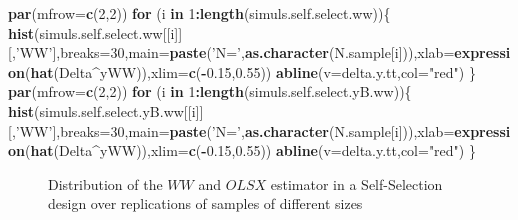 \documentclass[]{book}
\newenvironment{Shaded}{\begin{snugshade}}{\end{snugshade}}
\newcommand{\ControlFlowTok}[1]{\textcolor[rgb]{0.13,0.29,0.53}{\textbf{#1}}}
\newcommand{\DataTypeTok}[1]{\textcolor[rgb]{0.13,0.29,0.53}{#1}}
\newcommand{\DecValTok}[1]{\textcolor[rgb]{0.00,0.00,0.81}{#1}}
\newcommand{\FloatTok}[1]{\textcolor[rgb]{0.00,0.00,0.81}{#1}}
\newcommand{\KeywordTok}[1]{\textcolor[rgb]{0.13,0.29,0.53}{\textbf{#1}}}
\newcommand{\NormalTok}[1]{#1}
\newcommand{\OperatorTok}[1]{\textcolor[rgb]{0.81,0.36,0.00}{\textbf{#1}}}
\newcommand{\StringTok}[1]{\textcolor[rgb]{0.31,0.60,0.02}{#1}}
\theoremstyle{definition}
\theoremstyle{definition}
\theoremstyle{definition}
\theoremstyle{remark}
\begin{document}
\begin{Shaded}
\begin{Highlighting}[]
\KeywordTok{par}\NormalTok{(}\DataTypeTok{mfrow=}\KeywordTok{c}\NormalTok{(}\DecValTok{2}\NormalTok{,}\DecValTok{2}\NormalTok{))}
\ControlFlowTok{for}\NormalTok{ (i }\ControlFlowTok{in} \DecValTok{1}\OperatorTok{:}\KeywordTok{length}\NormalTok{(simuls.self.select.ww))\{}
  \KeywordTok{hist}\NormalTok{(simuls.self.select.ww[[i]][,}\StringTok{'WW'}\NormalTok{],}\DataTypeTok{breaks=}\DecValTok{30}\NormalTok{,}\DataTypeTok{main=}\KeywordTok{paste}\NormalTok{(}\StringTok{'N='}\NormalTok{,}\KeywordTok{as.character}\NormalTok{(N.sample[i])),}\DataTypeTok{xlab=}\KeywordTok{expression}\NormalTok{(}\KeywordTok{hat}\NormalTok{(Delta}\OperatorTok{^}\NormalTok{yWW)),}\DataTypeTok{xlim=}\KeywordTok{c}\NormalTok{(}\OperatorTok{-}\FloatTok{0.15}\NormalTok{,}\FloatTok{0.55}\NormalTok{))}
  \KeywordTok{abline}\NormalTok{(}\DataTypeTok{v=}\NormalTok{delta.y.tt,}\DataTypeTok{col=}\StringTok{"red"}\NormalTok{)}
\NormalTok{\}}
\KeywordTok{par}\NormalTok{(}\DataTypeTok{mfrow=}\KeywordTok{c}\NormalTok{(}\DecValTok{2}\NormalTok{,}\DecValTok{2}\NormalTok{))}
\ControlFlowTok{for}\NormalTok{ (i }\ControlFlowTok{in} \DecValTok{1}\OperatorTok{:}\KeywordTok{length}\NormalTok{(simuls.self.select.yB.ww))\{}
  \KeywordTok{hist}\NormalTok{(simuls.self.select.yB.ww[[i]][,}\StringTok{'WW'}\NormalTok{],}\DataTypeTok{breaks=}\DecValTok{30}\NormalTok{,}\DataTypeTok{main=}\KeywordTok{paste}\NormalTok{(}\StringTok{'N='}\NormalTok{,}\KeywordTok{as.character}\NormalTok{(N.sample[i])),}\DataTypeTok{xlab=}\KeywordTok{expression}\NormalTok{(}\KeywordTok{hat}\NormalTok{(Delta}\OperatorTok{^}\NormalTok{yWW)),}\DataTypeTok{xlim=}\KeywordTok{c}\NormalTok{(}\OperatorTok{-}\FloatTok{0.15}\NormalTok{,}\FloatTok{0.55}\NormalTok{))}
  \KeywordTok{abline}\NormalTok{(}\DataTypeTok{v=}\NormalTok{delta.y.tt,}\DataTypeTok{col=}\StringTok{"red"}\NormalTok{)}
\NormalTok{\}}
\end{Highlighting}
\end{Shaded}

\begin{figure}[htbp]

{\centering {}

}

\caption{Distribution of the $WW$ and $OLSX$ estimator in a Self-Selection design over replications of samples of different sizes}\label{fig:montecarlohistselfselectww}
\end{figure}
\end{document}
